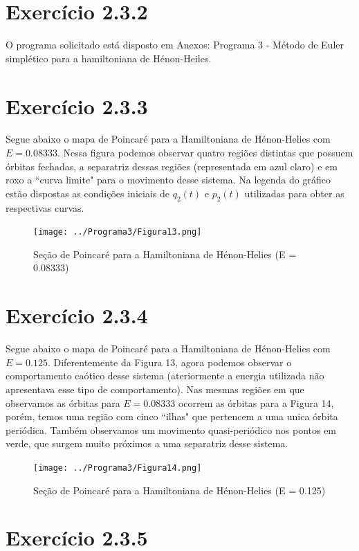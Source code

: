 \documentclass[a4paper,10pt]{article}
\begin{document}
\section*{Exercício 2.3.2}
  O programa solicitado está disposto em Anexos: Programa 3 - Método de Euler simplético para a hamiltoniana de Hénon-Heiles.

\section*{Exercício 2.3.3}

  Segue abaixo o mapa de Poincaré para a Hamiltoniana de Hénon-Helies com $E = 0.08333$. Nessa figura podemos observar quatro regiões distintas
  que possuem órbitas fechadas, a separatriz dessas regiões (representada em azul claro) e em roxo a ``curva limite" para o movimento desse sistema.
  Na legenda do gráfico estão dispostas as condições iniciais de $q_2(t)$ e $p_2(t)$ utilizadas para obter as respectivas curvas.

\begin{figure}[H]
  \centering
  \texttt{[image: ../Programa3/Figura13.png]}
  \caption{Seção de Poincaré para a Hamiltoniana de Hénon-Helies (E = 0.08333)}
\end{figure}

\section*{Exercício 2.3.4}

  Segue abaixo o mapa de Poincaré para a Hamiltoniana de Hénon-Helies com $E = 0.125$. Diferentemente da Figura 13, agora podemos observar
  o comportamento caótico desse sistema (ateriormente a energia utilizada não apresentava esse tipo de comportamento). Nas mesmas regiões em
  que observamos as órbitas para $E = 0.08333$ ocorrem as órbitas para a Figura 14, porém, temos uma região com cinco ``ilhas" que pertencem
  a uma unica órbita periódica. Também observamos um movimento quasi-periódico nos pontos em verde, que surgem muito próximos a uma separatriz
  desse sistema.

\begin{figure}[H]
  \centering
  \texttt{[image: ../Programa3/Figura14.png]}
  \caption{Seção de Poincaré para a Hamiltoniana de Hénon-Helies (E = 0.125)}
\end{figure}

\section*{Exercício 2.3.5}
\end{document}
